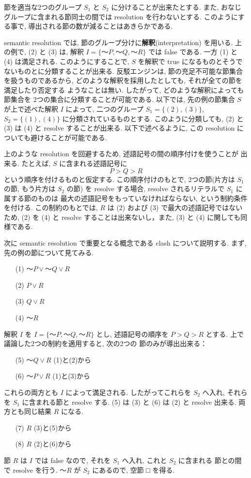 節を適当な2つのグループ $S_1$ と $S_2$ に分けることが出来たとする.
また, おなじグループに含まれる節同士の間では resolution を行わないとする.
このようにする事で, 導出される節の数が減ることはあきらかである.

semantic resolution では, 節のグループ分けに\textbf{解釈}(interpretation)
を用いる. 上の例で, (2) と (3) は, 解釈 $I = \{〜P, 〜Q, 〜R\}$ では
false である. 一方 (1) と (4) は満足される. このようにすることで, 
$S$ を解釈で true になるものとそうでないものとに分類することが出来る.
反駁エンジンは, 節の充足不可能な節集合を扱うものであるから,
どのような解釈を採用したとしても, それが全ての節を満足したり否定する
ようなことは無い. したがって, どのような解釈によっても節集合を
2つの集合に分類することが可能である.
以下では, 先の例の節集合 $S$ が上で述べた解釈 $I$ によって,
二つのグループ 
$S_1 = \{(2), (3)\}$, $S_2 = \{(1), (4)\}$ に分類されているものとする.
このように分類しても, (2) と (3) は (4) と resolve することが出来る.
以下で述べるように, この resolution についても避けることが可能である.

上のような resolution を回避するため, 述語記号の間の順序付けを使うことが
出来る.
たとえば, $S$ に含まれる述語記号に
\[ P > Q > R \]
という順序を付けるものと仮定する.
この順序付けのもとで, 2つの節(片方は $S_1$ の節, もう片方は $S_2$ の節)
を resolve する場合, resolve されるリテラルで $S_1$ に属する節のものは
最大の述語記号をもっていなければならない, という制約条件を付ける.
この制約のもとでは, $R$ は (2) および (3) で最大の述語記号ではないため,
(2) を (4) と resolve することは出来ないし，また, (3) と (4) に関しても同様である.  

次に semantic resolution で重要となる概念である clash について説明する.
まず, 先の例の節について見てみる.
\begin{enumerate}
\item[(1)] $〜P\lor 〜Q \lor R$
\item[(2)] $P\lor R$
\item[(3)] $Q\lor R$
\item[(4)] $〜R$
\end{enumerate}
解釈 $I$ を $I = \{〜P,〜Q,〜R\}$ とし, 述語記号の順序を 
$P > Q > R$ とする. 上で議論した2つの制約を適用すると, 次の2つの
節のみが導出出来る：
\begin{enumerate}
\item[(5)] $〜Q\lor R$ \hskip4cm (1)と(2)から
\item[(6)] $〜P\lor R$ \hskip4cm (1)と(3)から
\end{enumerate}
これらの両方とも $I$ によって満足される. したがってこれらを $S_2$ へ入れ,
それらを $S_1$ に含まれる節と resolve する. 
(5) は (3) と (6) は (2) と resolve 出来る. 両方とも同じ結果 $R$ になる.
\begin{enumerate}
\item[(7)] $R$ \hskip5cm (3)と(5)から
\item[(8)] $R$ \hskip5cm (2)と(6)から
\end{enumerate}
節 $R$ は $I$ では false なので, それを $S_1$ へ入れ, これと $S_2$ に含まれる
節との間で resolve を行う. $〜R$ が $S_2$ にあるので, 空節 □ を得る.

